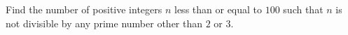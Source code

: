 Find the number of positive integers $n$ less than or equal to $100$ such that $n$ is not divisible by any prime number other than $2$ or $3$.
